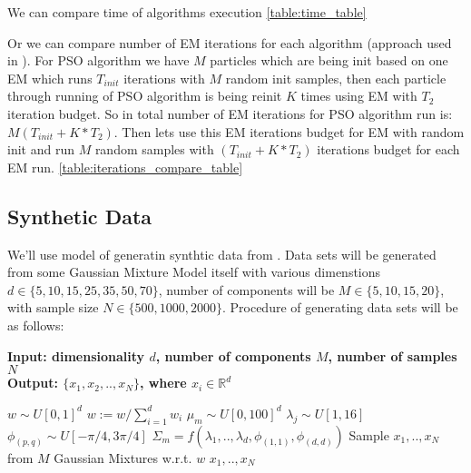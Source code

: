 \documentclass[a4paper]{article}
\begin{document}
We can compare time of algorithms execution \ref{table:time_table}

Or we can compare number of EM iterations for each algorithm (approach used in \cite{ARI20122804}). For PSO algorithm we have $M$ particles
which are being init based on one EM which runs $T_{init}$ iterations with $M$ random init samples, then 
each particle through running of PSO algorithm is being reinit $K$ times using EM with $T_2$ iteration budget.
So in total number of EM iterations for PSO algorithm run is: $M(T_{init} + K*T_2)$. Then lets use this EM iterations budget
for EM with random init and run $M$ random samples with $(T_{init} + K*T_2)$ iterations budget for each EM run. \ref{table:iterations_compare_table}

\subsection{Synthetic Data}

We'll use model of generatin synthtic data from \cite{ARI20122804}. Data sets will be generated from some Gaussian Mixture Model itself with
 various dimenstions $d \in \{5, 10, 15, 25, 35, 50, 70\}$, number of components will be $M \in \{5, 10, 15, 20\}$, with sample size $N \in \{500, 1000, 2000\}$.
Procedure of generating data sets will be as follows:

\begin{algorithm}
    \caption{}\label{alg:cap}
    \hspace*{\algorithmicindent} \textbf{Input: dimensionality $d$, number of components $M$, number of samples $N$} \\
    \hspace*{\algorithmicindent} \textbf{Output: $\{x_1, x_2, .., x_N\}$, where $x_i \in \mathbb{R}^d$}
    \begin{algorithmic}
        \State $w \sim U[0, 1]^d$
        \State $w := w / \sum_{i=1}^d w_i$
            \State $\mu_m \sim U[0, 100]^d$
                \State $\lambda_j  \sim U[1, 16]$ 
                    \State $\phi_{(p,q)} \sim U[-\pi/4, 3\pi/4]$ 
                \EndFor
                \State
            \State $\Sigma_m = f(\lambda_1, .., \lambda_d, \phi_{(1, 1)}, \phi_{(d, d)})$ 
            \EndFor
            \State Sample $x_1, .., x_N$ from $M$ Gaussian Mixtures w.r.t. $w$ 
        \EndFor 
        \State \Return $x_1, .., x_N$
    \end{algorithmic}
\end{algorithm}
\end{document}
